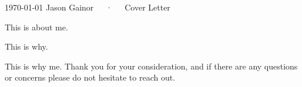 \documentclass[11pt, a4paper]{awesome-cv}
\begin{document}
\makecvheader[L]

\makecvfooter
  {\today}
  {Jason Gainor~~~·~~~Cover Letter}
  {}

\makelettertitle
\begin{cvletter}

This is about me.

This is why.

This is why me.
\newline
\newline
Thank you for your consideration, and if there are any questions or concerns please do not hesitate to reach out.

\end{cvletter}

\makeletterclosing
\end{document}
